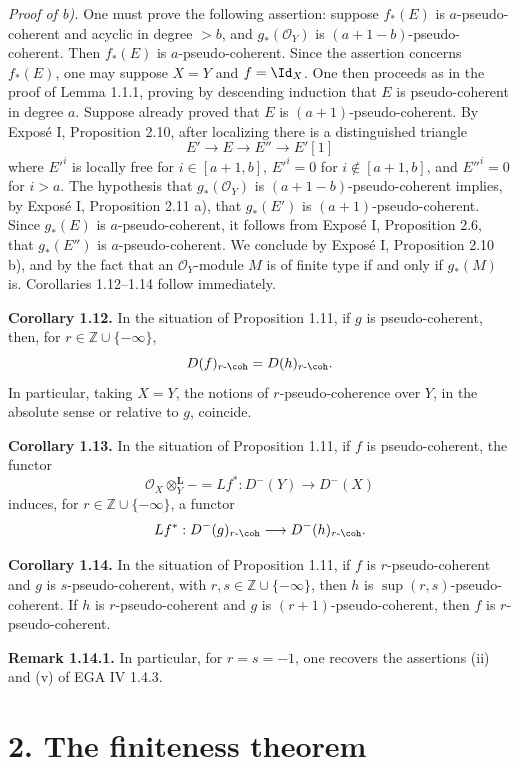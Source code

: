\emph{Proof of b).} One must prove the following assertion: suppose \(f_*(E)\) is \(a\)-pseudo-coherent and acyclic in degree \(>b\), and \(g_*(\mathcal O_Y)\) is \((a+1-b)\)-pseudo-coherent. Then \(f_*(E)\) is \(a\)-pseudo-coherent. Since the assertion concerns \(f_*(E)\), one may suppose \(X=Y\) and \(f=\Id_X\). One then proceeds as in the proof of Lemma 1.1.1, proving by descending induction that \(E\) is pseudo-coherent in degree \(a\). Suppose already proved that \(E\) is \((a+1)\)-pseudo-coherent. By Exposé I, Proposition 2.10, after localizing there is a distinguished triangle
\[
E'\longrightarrow E\longrightarrow E''\longrightarrow E'[1]
\]
where \(E'^i\) is locally free for \(i\in [a+1,b]\), \(E'^i=0\) for \(i\notin [a+1,b]\), and \(E''^i=0\) for \(i>a\). The hypothesis that \(g_*(\mathcal O_Y)\) is \((a+1-b)\)-pseudo-coherent implies, by Exposé I, Proposition 2.11 a), that \(g_*(E')\) is \((a+1)\)-pseudo-coherent. Since \(g_*(E)\) is \(a\)-pseudo-coherent, it follows from Exposé I, Proposition 2.6, that \(g_*(E'')\) is \(a\)-pseudo-coherent. We conclude by Exposé I, Proposition 2.10 b), and by the fact that an \(\mathcal O_Y\)-module \(M\) is of finite type if and only if \(g_*(M)\) is. Corollaries 1.12--1.14 follow immediately.

\textbf{Corollary 1.12.} In the situation of Proposition 1.11, if \(g\) is pseudo-coherent, then, for \(r\in\mathbb Z\cup\{-\infty\}\),
\[
  D(f)_{r\text{-}\coh}=D(h)_{r\text{-}\coh}.
\]
In particular, taking \(X=Y\), the notions of \(r\)-pseudo-coherence over \(Y\), in the absolute sense or relative to \(g\), coincide.

\textbf{Corollary 1.13.} In the situation of Proposition 1.11, if \(f\) is pseudo-coherent, the functor
\[
  \mathcal O_X\otimes_Y^{\mathbf L}-=Lf^*:D^{-}(Y)\longrightarrow D^{-}(X)
\]
induces, for \(r\in\mathbb Z\cup\{-\infty\}\), a functor
\[
  Lf^*:D^{-}(g)_{r\text{-}\coh}\longrightarrow D^{-}(h)_{r\text{-}\coh}.
\]

\textbf{Corollary 1.14.} In the situation of Proposition 1.11, if \(f\) is \(r\)-pseudo-coherent and \(g\) is \(s\)-pseudo-coherent, with \(r,s\in\mathbb Z\cup\{-\infty\}\), then \(h\) is \(\sup(r,s)\)-pseudo-coherent. If \(h\) is \(r\)-pseudo-coherent and \(g\) is \((r+1)\)-pseudo-coherent, then \(f\) is \(r\)-pseudo-coherent.

\textbf{Remark 1.14.1.} In particular, for \(r=s=-1\), one recovers the assertions (ii) and (v) of EGA IV 1.4.3.

\section*{2. The finiteness theorem}

